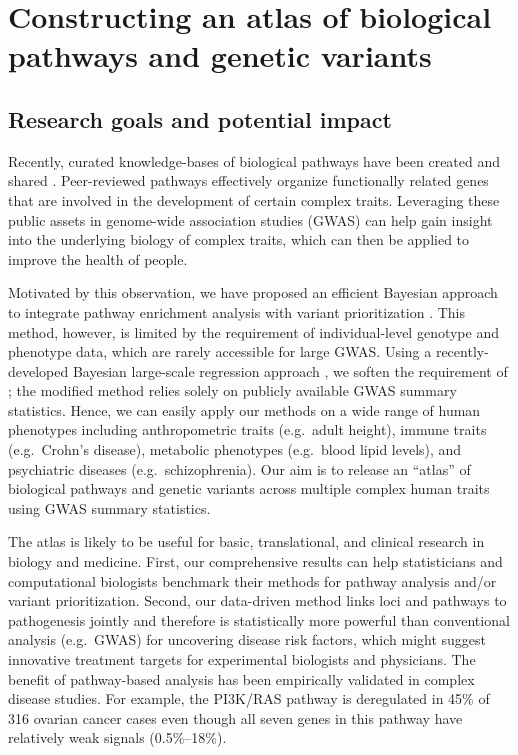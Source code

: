 \documentclass[10pt]{article}
\begin{document}
\section*{Constructing an atlas of biological pathways and genetic variants}

\subsection*{Research goals and potential
impact}\label{research-goals-and-the-potential-impact}

Recently, curated knowledge-bases of biological pathways have been
created and shared \cite{demir.cary.ea:biopax}. Peer-reviewed pathways
effectively organize functionally related genes that are involved in
the development of certain complex traits. Leveraging these public
assets in genome-wide association studies (GWAS) can help gain insight
into the underlying biology of complex traits, which can then be
applied to improve the health of people.

Motivated by this observation, we have proposed an efficient Bayesian
approach \cite{carbonetto.stephens:integrated} to integrate pathway
enrichment analysis \cite{wang.li.ea:analysing} with variant
prioritization \cite{cantor.lange.ea:prioritizing}. This method,
however, is limited by the requirement of individual-level genotype
and phenotype data, which are rarely accessible for large GWAS. Using
a recently-developed Bayesian large-scale regression approach
\cite{zhu.stephens:bayesian}, we soften the requirement of
\cite{carbonetto.stephens:integrated}; the modified method relies
solely on publicly available GWAS summary statistics. Hence, we can
easily apply our methods on a wide range of human phenotypes including
anthropometric traits (e.g.~adult height), immune traits (e.g.~Crohn's
disease), metabolic phenotypes (e.g.~blood lipid levels), and
psychiatric diseases (e.g.~schizophrenia). Our aim is to release an
``atlas'' of biological pathways and genetic variants across multiple
complex human traits using GWAS summary statistics.

The atlas is likely to be useful for basic, translational, and
clinical research in biology and medicine. First, our comprehensive
results can help statisticians and computational biologists benchmark
their methods for pathway analysis and/or variant prioritization.
Second, our data-driven method links loci and pathways to pathogenesis
jointly and therefore is statistically more powerful than conventional
analysis (e.g.~GWAS) for uncovering disease risk factors, which might
suggest innovative treatment targets for experimental biologists and
physicians.  The benefit of pathway-based analysis has been
empirically validated in complex disease studies. For example, the
PI3K/RAS pathway is deregulated in 45\% of 316 ovarian cancer cases
\cite{cancer-genome-atlas-research-network:integrated} even though all
seven genes in this pathway have relatively weak signals
(0.5\%--18\%).
\end{document}
